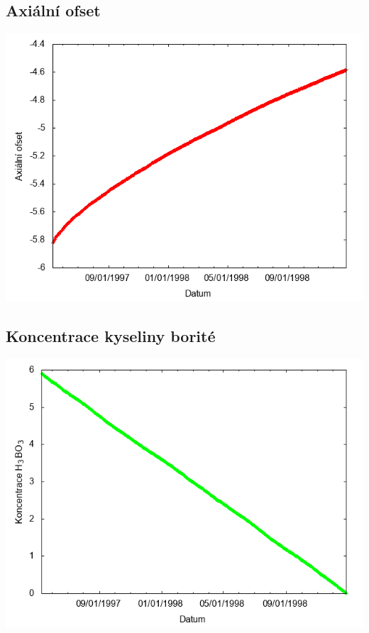 \documentclass[a4paper,twoside,11pt]{article}
\begin{document}
\subsection*{Axiální ofset}
\begin{center}
\includegraphics[width=.8\textwidth]{graphs/CandyMountain_10_ao.png}
\end{center}

\subsection*{Koncentrace kyseliny borité}
\begin{center}
\includegraphics[width=.8\textwidth]{graphs/CandyMountain_10_bc.png}
\end{center}
\end{document}
